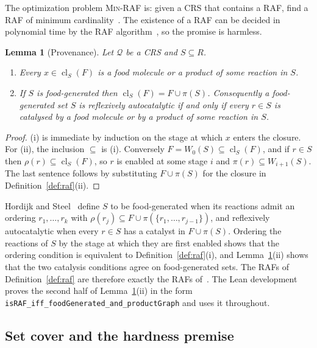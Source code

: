 \documentclass[11pt,a4paper]{article}
\theoremstyle{plain}
\newtheorem{lemma}[theorem]{Lemma}
\theoremstyle{definition}
\theoremstyle{remark}
\newcommand{\cl}{\operatorname{cl}}
\newcommand{\cQ}{\mathcal{Q}}
\newcommand{\lean}[1]{\texttt{#1}}
\newcommand{\MinRAF}{\textup{\textsc{Min-RAF}}}
\begin{document}
The optimization problem \MinRAF{} is: given a CRS that contains a RAF, find a RAF of minimum cardinality~\cite{steel2013minimal}. The existence of a RAF can be decided in polynomial time by the RAF algorithm~\cite{hordijk2004detecting}, so the promise is harmless.

\begin{lemma}[Provenance]\label{lem:provenance}
Let $\cQ$ be a CRS and $S\subseteq R$.
\begin{enumerate}[label=(\roman*)]
\item Every $x\in\cl_S(F)$ is a food molecule or a product of some reaction in $S$.
\item If $S$ is food-generated then $\cl_S(F)=F\cup\pi(S)$. Consequently a food-generated set $S$ is reflexively autocatalytic if and only if every $r\in S$ is catalysed by a food molecule or by a product of some reaction in $S$.
\end{enumerate}
\end{lemma}

\begin{proof}
(i) is immediate by induction on the stage at which $x$ enters the closure. For (ii), the inclusion $\subseteq$ is (i). Conversely $F=W_0(S)\subseteq\cl_S(F)$, and if $r\in S$ then $\rho(r)\subseteq\cl_S(F)$, so $r$ is enabled at some stage $i$ and $\pi(r)\subseteq W_{i+1}(S)$. The last sentence follows by substituting $F\cup\pi(S)$ for the closure in Definition~\ref{def:raf}(ii).
\end{proof}

Hordijk and Steel~\cite{hordijk2004detecting} define $S$ to be food-generated when its reactions admit an ordering $r_1,\dots,r_k$ with $\rho(r_j)\subseteq F\cup\pi(\{r_1,\dots,r_{j-1}\})$, and reflexively autocatalytic when every $r\in S$ has a catalyst in $F\cup\pi(S)$. Ordering the reactions of $S$ by the stage at which they are first enabled shows that the ordering condition is equivalent to Definition~\ref{def:raf}(i), and Lemma~\ref{lem:provenance}(ii) shows that the two catalysis conditions agree on food-generated sets. The RAFs of Definition~\ref{def:raf} are therefore exactly the RAFs of~\cite{hordijk2004detecting,steel2013minimal}. The Lean development proves the second half of Lemma~\ref{lem:provenance}(ii) in the form \lean{isRAF\_iff\_foodGenerated\_and\_productGraph} and uses it throughout.

\subsection{Set cover and the hardness premise}\label{sec:setcover}
\end{document}
